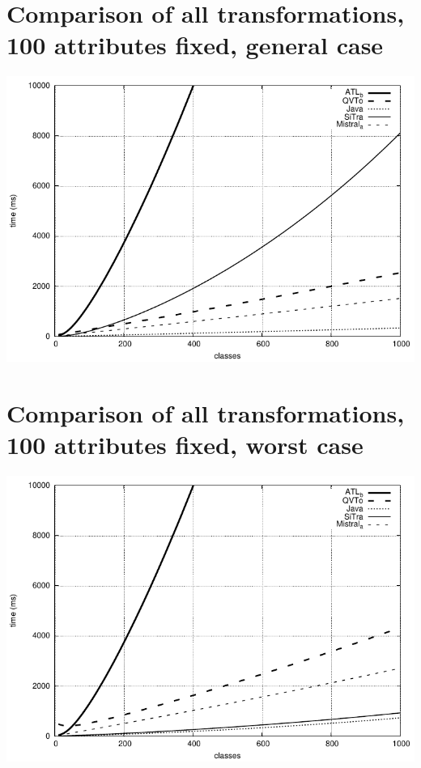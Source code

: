 \documentclass[a4paper,final]{article}
\begin{document}
\section*{Comparison of all transformations, 100 attributes fixed, general case}
\includegraphics[width=\textwidth]{100attributes_compared_general}

\section*{Comparison of all transformations, 100 attributes fixed, worst case}
\includegraphics[width=\textwidth]{100attributes_compared_worst}
\end{document}
